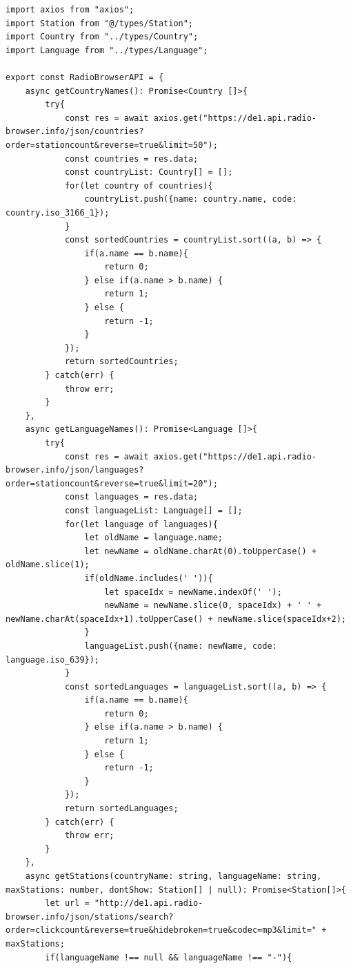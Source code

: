 \documentclass[11pt, twoside]{article}
\begin{document}
\begin{lstlisting}
import axios from "axios";
import Station from "@/types/Station";
import Country from "../types/Country";
import Language from "../types/Language";

export const RadioBrowserAPI = {
    async getCountryNames(): Promise<Country []>{
        try{
            const res = await axios.get("https://de1.api.radio-browser.info/json/countries?order=stationcount&reverse=true&limit=50");
            const countries = res.data;
            const countryList: Country[] = [];
            for(let country of countries){
                countryList.push({name: country.name, code: country.iso_3166_1});
            }
            const sortedCountries = countryList.sort((a, b) => {
                if(a.name == b.name){
                    return 0;
                } else if(a.name > b.name) {
                    return 1;
                } else {
                    return -1;
                }
            });
            return sortedCountries;
        } catch(err) {
            throw err;
        }
    },
    async getLanguageNames(): Promise<Language []>{
        try{
            const res = await axios.get("https://de1.api.radio-browser.info/json/languages?order=stationcount&reverse=true&limit=20");
            const languages = res.data;
            const languageList: Language[] = [];
            for(let language of languages){
                let oldName = language.name;
                let newName = oldName.charAt(0).toUpperCase() + oldName.slice(1);
                if(oldName.includes(' ')){
                    let spaceIdx = newName.indexOf(' ');
                    newName = newName.slice(0, spaceIdx) + ' ' + newName.charAt(spaceIdx+1).toUpperCase() + newName.slice(spaceIdx+2);
                }
                languageList.push({name: newName, code: language.iso_639});
            }
            const sortedLanguages = languageList.sort((a, b) => {
                if(a.name == b.name){
                    return 0;
                } else if(a.name > b.name) {
                    return 1;
                } else {
                    return -1;
                }
            });
            return sortedLanguages;
        } catch(err) {
            throw err;
        }
    },
    async getStations(countryName: string, languageName: string, maxStations: number, dontShow: Station[] | null): Promise<Station[]>{
        let url = "http://de1.api.radio-browser.info/json/stations/search?order=clickcount&reverse=true&hidebroken=true&codec=mp3&limit=" + maxStations;
        if(languageName !== null && languageName !== "-"){

\end{lstlisting}
\end{document}
